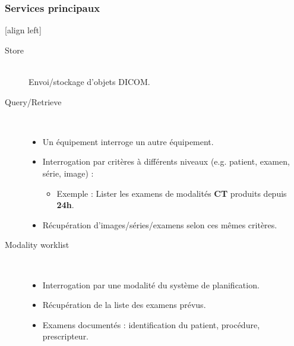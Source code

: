 \frame
{
	\frametitle{Services principaux}
	[align left]
	\begin{description}
		\item[Store]~\\
		Envoi/stockage d'objets DICOM.
		\item[Query/Retrieve]~\\
		\begin{itemize}
			\item Un \'equipement interroge un autre \'equipement.
			\item Interrogation par crit\`eres \`a diff\'erents niveaux (e.g. patient, examen, s\'erie, image) :
			\begin{itemize}
				\item Exemple : Lister les examens de modalit\'es \textbf{CT} produits depuis \textbf{24h}.
			\end{itemize}
			\item R\'ecup\'eration d'images/s\'eries/examens selon ces m\^emes crit\`eres.
		\end{itemize}
		\item[Modality worklist]~\\
		\begin{itemize}
			\item Interrogation par une modalit\'e du syst\`eme de planification.
			\item R\'ecup\'eration de la liste des examens pr\'evus.
			\item Examens document\'es : identification du patient, proc\'edure, prescripteur.
		\end{itemize}
	\end{description}
}


